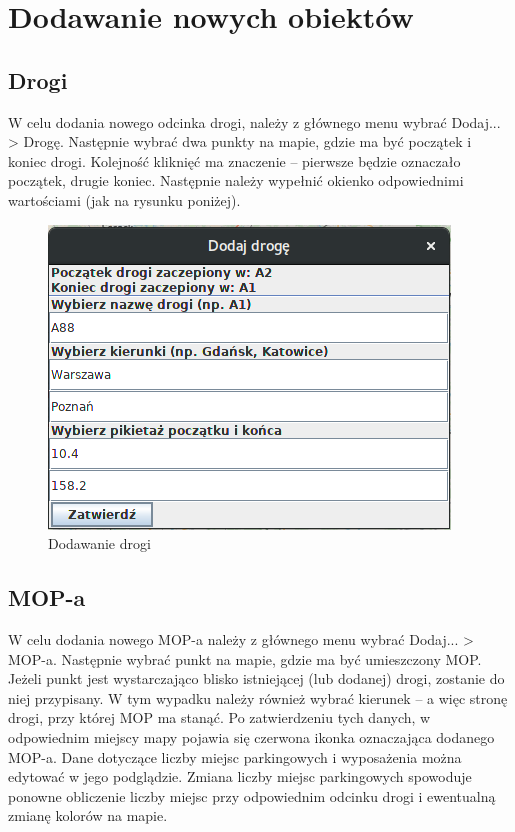 \documentclass[10pt,paper=a4 BCOR0, DIV15, titlepage=false, oneside]{scrbook} %
\begin{document}
        \chapter*{Dodawanie nowych obiektów}
        \setcounter{section}{0}
        \addtocounter{chapter}{1}
        \section{Drogi}
        W celu dodania nowego odcinka drogi, należy z głównego menu wybrać
        Dodaj... > Drogę. Następnie wybrać dwa punkty na mapie, gdzie ma być
        początek i koniec drogi. Kolejność kliknięć ma znaczenie -- pierwsze
        będzie oznaczało początek, drugie koniec. Następnie należy wypełnić
        okienko odpowiednimi wartościami (jak na rysunku poniżej). 

       \begin{figure}[ht]
        \centering
       \includegraphics[width=.3\textwidth]{dodawanie_drogi.png}
        \caption{Dodawanie drogi}
      \end{figure}

      \section{MOP-a}
      W celu dodania nowego MOP-a należy z głównego menu wybrać Dodaj... >
      MOP-a. Następnie wybrać punkt na mapie, gdzie ma być umieszczony MOP.
      Jeżeli punkt jest wystarczająco blisko istniejącej (lub dodanej) drogi,
      zostanie do niej przypisany. W tym wypadku należy również wybrać kierunek
      -- a więc stronę drogi, przy której MOP ma stanąć. Po zatwierdzeniu tych
      danych, w odpowiednim miejscy mapy pojawia się czerwona ikonka
      oznaczająca dodanego MOP-a. Dane dotyczące liczby miejsc parkingowych i
      wyposażenia można edytować w jego podglądzie. Zmiana liczby miejsc
      parkingowych spowoduje ponowne obliczenie liczby miejsc przy odpowiednim
      odcinku drogi i ewentualną zmianę kolorów na mapie. 
\end{document}
